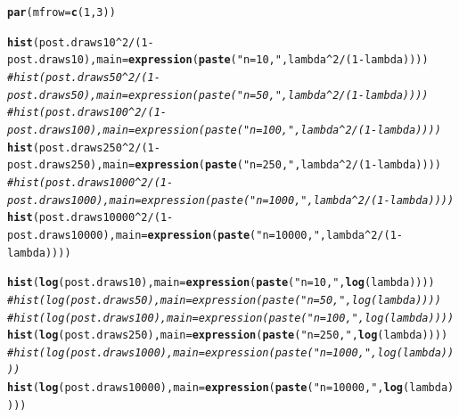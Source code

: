 \documentclass[12pt]{article}\usepackage[]{graphicx}\usepackage[]{color}
\makeatletter
\newcommand{\hlnum}[1]{\textcolor[rgb]{0.686,0.059,0.569}{#1}}%
\newcommand{\hlstr}[1]{\textcolor[rgb]{0.192,0.494,0.8}{#1}}%
\newcommand{\hlcom}[1]{\textcolor[rgb]{0.678,0.584,0.686}{\textit{#1}}}%
\newcommand{\hlopt}[1]{\textcolor[rgb]{0,0,0}{#1}}%
\newcommand{\hlstd}[1]{\textcolor[rgb]{0.345,0.345,0.345}{#1}}%
\newcommand{\hlkwc}[1]{\textcolor[rgb]{0.333,0.667,0.333}{#1}}%
\newcommand{\hlkwd}[1]{\textcolor[rgb]{0.737,0.353,0.396}{\textbf{#1}}}%
\newenvironment{kframe}{%
 \def\at@end@of@kframe{}%
 \ifinner\ifhmode%
  \def\at@end@of@kframe{\end{minipage}}%
  \begin{minipage}{\columnwidth}%
 \fi\fi%
 \def\FrameCommand##1{\hskip\@totalleftmargin \hskip-\fboxsep
 \colorbox{shadecolor}{##1}\hskip-\fboxsep
     \hskip-\linewidth \hskip-\@totalleftmargin \hskip\columnwidth}%
 \MakeFramed {\advance\hsize-\width
   \@totalleftmargin\z@ \linewidth\hsize
   \@setminipage}}%
 {\par\unskip\endMakeFramed%
 \at@end@of@kframe}
\newenvironment{knitrout}{}{} %
\makeatother
\begin{document}
\begin{knitrout}\footnotesize
{}\color{fgcolor}\begin{kframe}
\begin{alltt}
\hlkwd{par}\hlstd{(}\hlkwc{mfrow}\hlstd{=}\hlkwd{c}\hlstd{(}\hlnum{1}\hlstd{,}\hlnum{3}\hlstd{))}

\hlkwd{hist}\hlstd{(post.draws10}\hlopt{^}\hlnum{2}\hlopt{/}\hlstd{(}\hlnum{1}\hlopt{-}\hlstd{post.draws10),} \hlkwc{main}\hlstd{=}\hlkwd{expression}\hlstd{(}\hlkwd{paste}\hlstd{(}\hlstr{"n=10, "}\hlstd{, lambda}\hlopt{^}\hlnum{2}\hlopt{/}\hlstd{(}\hlnum{1}\hlopt{-}\hlstd{lambda))))}
\hlcom{#hist(post.draws50^2/(1-post.draws50), main=expression(paste("n=50, ", lambda^2/(1-lambda))))}
\hlcom{#hist(post.draws100^2/(1-post.draws100), main=expression(paste("n=100, ", lambda^2/(1-lambda))))}
\hlkwd{hist}\hlstd{(post.draws250}\hlopt{^}\hlnum{2}\hlopt{/}\hlstd{(}\hlnum{1}\hlopt{-}\hlstd{post.draws250),} \hlkwc{main}\hlstd{=}\hlkwd{expression}\hlstd{(}\hlkwd{paste}\hlstd{(}\hlstr{"n=250, "}\hlstd{, lambda}\hlopt{^}\hlnum{2}\hlopt{/}\hlstd{(}\hlnum{1}\hlopt{-}\hlstd{lambda))))}
\hlcom{#hist(post.draws1000^2/(1-post.draws1000), main=expression(paste("n=1000, ", lambda^2/(1-lambda))))}
\hlkwd{hist}\hlstd{(post.draws10000}\hlopt{^}\hlnum{2}\hlopt{/}\hlstd{(}\hlnum{1}\hlopt{-}\hlstd{post.draws10000),} \hlkwc{main}\hlstd{=}\hlkwd{expression}\hlstd{(}\hlkwd{paste}\hlstd{(}\hlstr{"n=10000, "}\hlstd{, lambda}\hlopt{^}\hlnum{2}\hlopt{/}\hlstd{(}\hlnum{1}\hlopt{-}\hlstd{lambda))))}

\hlkwd{hist}\hlstd{(}\hlkwd{log}\hlstd{(post.draws10),} \hlkwc{main}\hlstd{=}\hlkwd{expression}\hlstd{(}\hlkwd{paste}\hlstd{(}\hlstr{"n=10, "}\hlstd{,} \hlkwd{log}\hlstd{(lambda))))}
\hlcom{#hist(log(post.draws50), main=expression(paste("n=50, ", log(lambda))))}
\hlcom{#hist(log(post.draws100), main=expression(paste("n=100, ", log(lambda))))}
\hlkwd{hist}\hlstd{(}\hlkwd{log}\hlstd{(post.draws250),} \hlkwc{main}\hlstd{=}\hlkwd{expression}\hlstd{(}\hlkwd{paste}\hlstd{(}\hlstr{"n=250, "}\hlstd{,} \hlkwd{log}\hlstd{(lambda))))}
\hlcom{#hist(log(post.draws1000), main=expression(paste("n=1000, ", log(lambda))))}
\hlkwd{hist}\hlstd{(}\hlkwd{log}\hlstd{(post.draws10000),} \hlkwc{main}\hlstd{=}\hlkwd{expression}\hlstd{(}\hlkwd{paste}\hlstd{(}\hlstr{"n=10000, "}\hlstd{,} \hlkwd{log}\hlstd{(lambda))))}
\end{alltt}
\end{kframe}
\end{knitrout}
\end{document}
